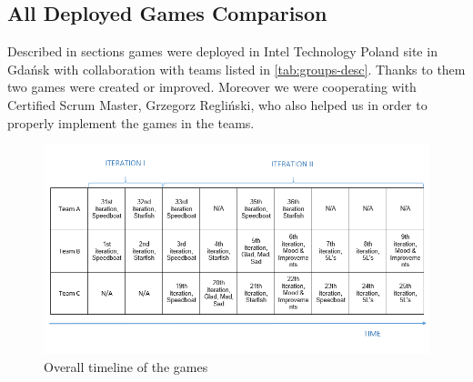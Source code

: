 \subsection{All Deployed Games Comparison}

Described in sections  games were deployed in Intel Technology Poland site in Gdańsk with collaboration with teams listed in \autoref{tab:groups-desc}. Thanks to them two games were created or improved. Moreover we were cooperating with Certified Scrum Master, Grzegorz Regliński, who also helped us in order to properly implement the games in the teams. 

\begin{figure}[!htbp]
\caption{Overall timeline of the games}
\label{fig:overallTimeline}
\centering
\includegraphics[width=1\textwidth]{img/overall}
\end{figure}

